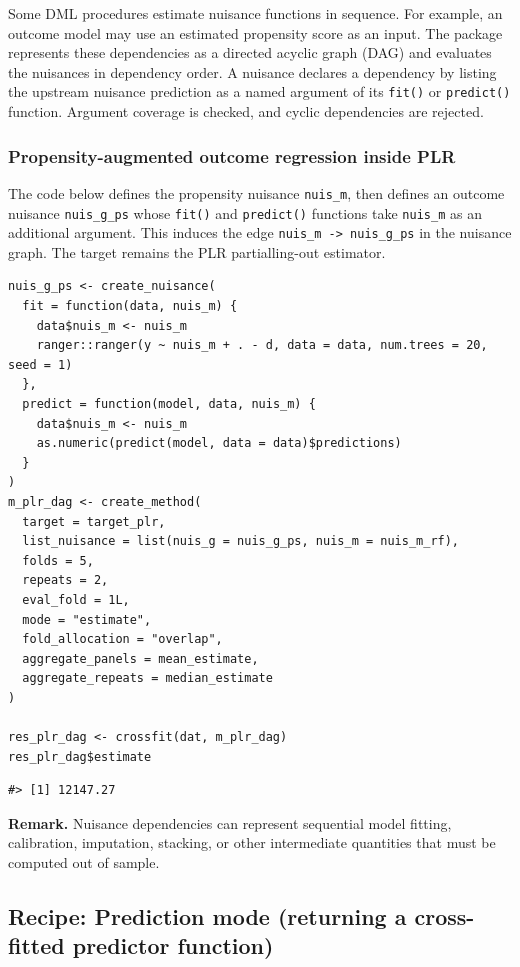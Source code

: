 Some DML procedures estimate nuisance functions in sequence. For example, an outcome model may use an estimated propensity score as an input. The package represents these dependencies as a directed acyclic graph (DAG) and evaluates the nuisances in dependency order. A nuisance declares a dependency by listing the upstream nuisance prediction as a named argument of its \texttt{fit()} or \texttt{predict()} function. Argument coverage is checked, and cyclic dependencies are rejected.

\subsubsection{Propensity-augmented outcome regression inside PLR}\label{propensity-augmented-outcome-regression-inside-plr}

The code below defines the propensity nuisance \texttt{nuis\_m}, then defines an outcome nuisance \texttt{nuis\_g\_ps} whose \texttt{fit()} and \texttt{predict()} functions take \texttt{nuis\_m} as an additional argument. This induces the edge \texttt{nuis\_m\ -\textgreater{}\ nuis\_g\_ps} in the nuisance graph. The target remains the PLR partialling-out estimator.

\begin{verbatim}
nuis_g_ps <- create_nuisance(
  fit = function(data, nuis_m) {
    data$nuis_m <- nuis_m
    ranger::ranger(y ~ nuis_m + . - d, data = data, num.trees = 20, seed = 1)
  },
  predict = function(model, data, nuis_m) {
    data$nuis_m <- nuis_m
    as.numeric(predict(model, data = data)$predictions)
  }
)
m_plr_dag <- create_method(
  target = target_plr,
  list_nuisance = list(nuis_g = nuis_g_ps, nuis_m = nuis_m_rf),
  folds = 5,
  repeats = 2,
  eval_fold = 1L,
  mode = "estimate",
  fold_allocation = "overlap",
  aggregate_panels = mean_estimate,
  aggregate_repeats = median_estimate
)

res_plr_dag <- crossfit(dat, m_plr_dag)
res_plr_dag$estimate
\end{verbatim}

\begin{verbatim}
#> [1] 12147.27
\end{verbatim}

\textbf{Remark.} Nuisance dependencies can represent sequential model fitting, calibration, imputation, stacking, or other intermediate quantities that must be computed out of sample.

\subsection{Recipe: Prediction mode (returning a cross-fitted predictor function)}\label{app:predict}

